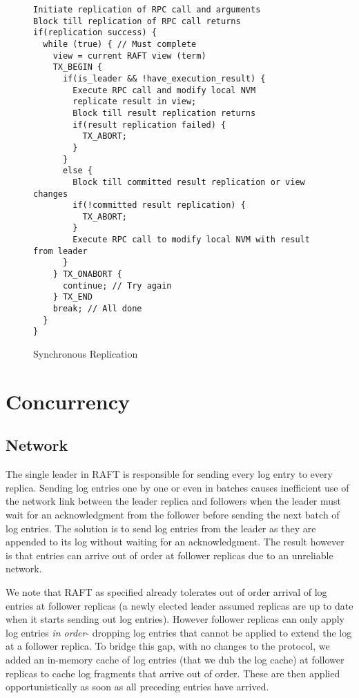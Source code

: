 \documentclass[twocolumn]{article}
\begin{document}
\begin{figure*}
\centering
\begin{minipage}{0.7\textwidth}  
{ \scriptsize
\begin{verbatim}
Initiate replication of RPC call and arguments
Block till replication of RPC call returns
if(replication success) {  
  while (true) { // Must complete 
    view = current RAFT view (term)
    TX_BEGIN {
      if(is_leader && !have_execution_result) {
        Execute RPC call and modify local NVM
        replicate result in view;
        Block till result replication returns
        if(result replication failed) {
          TX_ABORT;
        }
      }
      else {
        Block till committed result replication or view changes
        if(!committed result replication) {
          TX_ABORT;
        }
        Execute RPC call to modify local NVM with result from leader
      }
    } TX_ONABORT {
      continue; // Try again
    } TX_END
    break; // All done
  }
}
\end{verbatim}
}
\end{minipage}
\caption{Synchronous Replication}
\label{fig:sync_rep}
\end{figure*}

\section{Concurrency}
\subsection{Network}
The single leader in RAFT is responsible for sending every log entry to every
replica. Sending log entries one by one or even in batches causes inefficient
use of the network link between the leader replica and followers when the leader
must wait for an acknowledgment from the follower before sending the next batch
of log entries. The solution is to send log entries from the leader as they are
appended to its log without waiting for an acknowledgment. The result however is
that entries can arrive out of order at follower replicas due to an unreliable
network.

We note that RAFT as specified already tolerates out of order arrival of log
entries at follower replicas (a newly elected leader assumed replicas are up to
date when it starts sending out log entries). However follower replicas can only
apply log entries \emph{in order}- dropping log entries that cannot be applied
to extend the log at a follower replica. To bridge this gap, with no changes to
the protocol, we added an in-memory cache of log entries (that we dub the log
cache) at follower replicas to cache log fragments that arrive out of
order. These are then applied opportunistically as soon as all preceding entries
have arrived.
\end{document}
